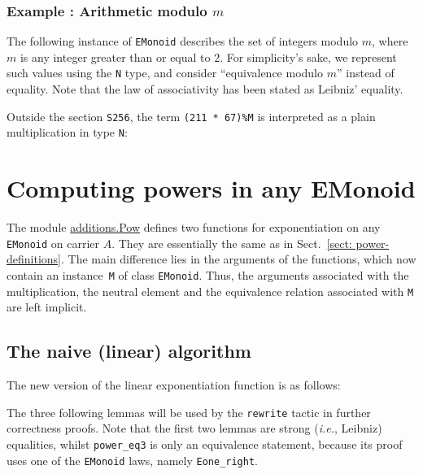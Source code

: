 

\subsubsection{Example : Arithmetic  modulo $m$}

 
The following instance of \texttt{EMonoid} describes the set of integers modulo
$m$, where $m$ is any integer greater than or equal to $2$.
For simplicity's sake, we represent such values using the \texttt{N} type,
and consider ``equivalence modulo \texttt{$m$}'' instead of equality.
Note that the law of associativity has been stated as Leibniz' equality.

 

Outside the section \texttt{S256}, the term \texttt{(211 * 67)\%M} is interpreted as a plain multiplication in type \texttt{N}:



\section{Computing powers in any EMonoid}

The  module \href{../theories/html/additions.Pow.html}{additions.Pow} defines two functions for exponentiation on any 
\texttt{EMonoid}  on carrier $A$.
They are essentially the same as in Sect.~\vref{sect: power-definitions}. The main difference lies in the arguments of the functions, which now contain
 an instance~\texttt{M} of class \texttt{EMonoid}. 
Thus, the arguments associated with the multiplication,
the neutral element and the equivalence relation associated with \texttt{M}
are left implicit.


\subsection{The naive (linear) algorithm}
The new version of the linear exponentiation function is as follows:


The three following lemmas will be used by the \texttt{rewrite} tactic in further
correctness proofs.
Note  that the first two lemmas are strong
(\emph{i.e.}, Leibniz) equalities, whilst \texttt{power\_eq3}  is only an equivalence statement, because its proof uses one of the \texttt{EMonoid} laws, namely
\texttt{Eone\_right}.

